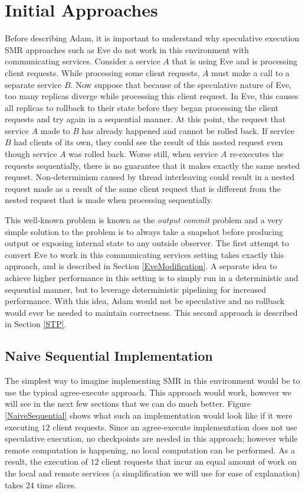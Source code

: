 \documentclass[11pt, oneside]{report}
\begin{document}
\section{Initial Approaches}

Before describing Adam, it is important to understand why speculative execution SMR approaches such as Eve do not work in this environment with communicating services. 
Consider a service $A$ that is using Eve and is processing client requests. 
While processing some client requests, $A$ must make a call to a separate service $B$. 
Now suppose that because of the speculative nature of Eve, too many replicas diverge while processing this client request. In Eve, this causes all replicas to rollback to their state before they began processing the client requests and try again in a sequential manner. 
At this point, the request that service $A$ made to $B$ has already happened and cannot be rolled back. 
If service $B$ had clients of its own, they could see the result of this nested request even though service $A$ was rolled back. 
Worse still, when service $A$ re-executes the requests sequentially, there is no guarantee that it makes exactly the same nested request. 
Non-determinism caused by thread interleaving could result in a nested request made as a result of the same client request that is different from the nested request that is made when processing sequentially.

This well-known problem is known as the \textit{output commit} problem \cite{mootaz} and a very simple solution to the problem is to always take a snapshot before producing output or exposing internal state to any outside observer. 
The first attempt to convert Eve to work in this communicating services setting takes exactly this approach, and is described in Section \ref{EveModification}. 
A separate idea to achieve higher performance in this setting is to simply run in a deterministic and sequential manner, but to leverage deterministic pipelining for increased performance. 
With this idea, Adam would not be speculative and no rollback would ever be needed to maintain correctness. 
This second approach is described in Section \ref{STP}.

\subsection{Naive Sequential Implementation}

The simplest way to imagine implementing SMR in this environment would be to use the typical agree-execute approach.
This approach would work, however we will see in the next few sections that we can do much better. 
Figure \ref{NaiveSequential} shows what such an implementation would look like if it were executing $12$ client requests. 
Since an agree-execute implementation does not use speculative execution, no checkpoints are needed in this approach; however while remote computation is happening, no local computation can be performed.
As a result, the execution of $12$ client requests that incur an equal amount of work on the local and remote services (a simplification we will use for ease of explanation) takes $24$ time slices.
\end{document}
